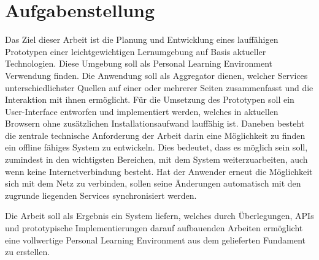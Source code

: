 \section{Aufgabenstellung}
Das Ziel dieser Arbeit ist die Planung und Entwicklung eines lauffähigen Prototypen einer leichtgewichtigen Lernumgebung auf Basis aktueller Technologien. Diese Umgebung soll als Personal Learning Environment Verwendung finden. Die Anwendung soll als Aggregator dienen, welcher Services unterschiedlichster Quellen auf einer oder mehrerer Seiten zusammenfasst und die Interaktion mit ihnen ermöglicht. Für die Umsetzung des Prototypen soll ein User-Interface entworfen und implementiert werden, welches in aktuellen Browsern ohne zusätzlichen Installationsaufwand lauffähig ist. Daneben besteht die zentrale technische Anforderung der Arbeit darin eine Möglichkeit zu finden ein offline fähiges System zu entwickeln. Dies bedeutet, dass es möglich sein soll, zumindest in den wichtigsten Bereichen, mit dem System weiterzuarbeiten, auch wenn keine Internetverbindung besteht. Hat der Anwender erneut die Möglichkeit sich mit dem Netz zu verbinden, sollen seine Änderungen automatisch mit den zugrunde liegenden Services synchronisiert werden.

Die Arbeit soll als Ergebnis ein System liefern, welches durch Überlegungen, APIs und prototypische Implementierungen darauf aufbauenden Arbeiten ermöglicht eine vollwertige Personal Learning Environment aus dem gelieferten Fundament zu erstellen.

